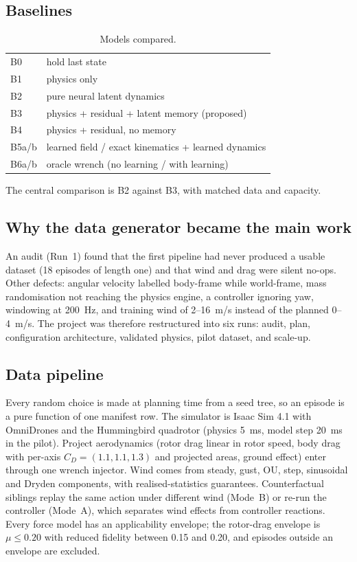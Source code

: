 \documentclass[conference]{IEEEtran}
\begin{document}
\subsection{Baselines}
\begin{table}[h]
\centering\small
\caption{Models compared.}
\begin{tabular}{ll}
\toprule
B0 & hold last state\\
B1 & physics only\\
B2 & pure neural latent dynamics\\
B3 & physics + residual + latent memory (proposed)\\
B4 & physics + residual, no memory\\
B5a/b & learned field / exact kinematics + learned dynamics\\
B6a/b & oracle wrench (no learning / with learning)\\
\bottomrule
\end{tabular}
\end{table}
The central comparison is B2 against B3, with matched data and capacity.

\subsection{Why the data generator became the main work}
An audit (Run~1) found that the first pipeline had never produced a usable dataset (18 episodes of length one) and that wind and drag were silent no-ops. Other defects: angular velocity labelled body-frame while world-frame, mass randomisation not reaching the physics engine, a controller ignoring yaw, windowing at 200~Hz, and training wind of 2--16~m/s instead of the planned 0--4~m/s. The project was therefore restructured into six runs: audit, plan, configuration architecture, validated physics, pilot dataset, and scale-up.

\subsection{Data pipeline}
Every random choice is made at planning time from a seed tree, so an episode is a pure function of one manifest row. The simulator is Isaac Sim 4.1 with OmniDrones and the Hummingbird quadrotor (physics 5~ms, model step 20~ms in the pilot). Project aerodynamics (rotor drag linear in rotor speed, body drag with per-axis $C_D=(1.1,1.1,1.3)$ and projected areas, ground effect) enter through one wrench injector. Wind comes from steady, gust, OU, step, sinusoidal and Dryden components, with realised-statistics guarantees. Counterfactual siblings replay the same action under different wind (Mode~B) or re-run the controller (Mode~A), which separates wind effects from controller reactions. Every force model has an applicability envelope; the rotor-drag envelope is $\mu\le 0.20$ with reduced fidelity between 0.15 and 0.20, and episodes outside an envelope are excluded.
\end{document}
